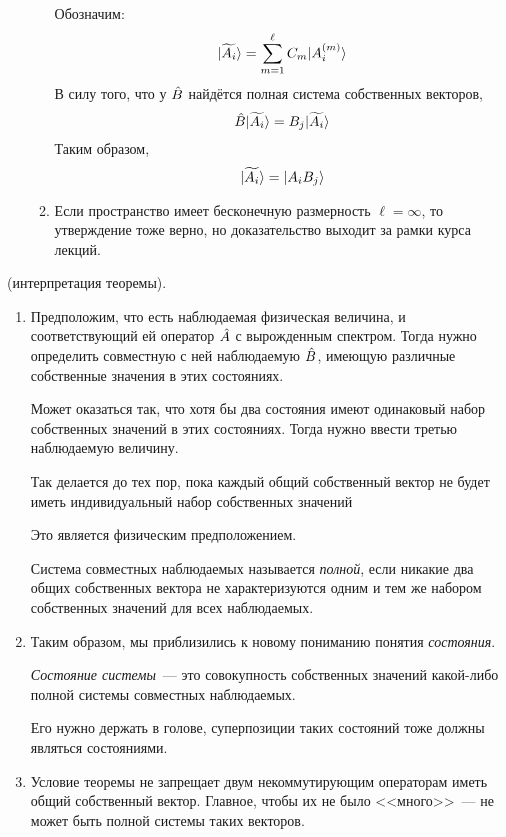\begin{itemize}
\begin{enumerate}
        Обозначим:
        $$
            | \widetilde{A_i} \rangle = \sum_{m=1}^\ell C_m | A_i^{(m)} \rangle
        $$
        В силу того, что у $\Hat B$ найдётся полная система собственных векторов,
        $$
            \Hat B | \widetilde{A_i} \rangle = B_j | \widetilde{A_i} \rangle
        $$
        Таким образом,
        $$
            | \widetilde{A_i} \rangle = | A_i B_j \rangle
        $$
    \item Если пространство имеет бесконечную размерность $\ell = \infty$, то утверждение тоже верно, но доказательство выходит за рамки курса лекций.
  \end{enumerate}%
\end{itemize}%

\Rem (интерпретация теоремы).
\begin{enumerate}
  \item Предположим, что есть наблюдаемая физическая величина, и соответствующий ей оператор $\Hat A$ с вырожденным спектром. Тогда нужно определить совместную с ней наблюдаемую $\Hat B$, имеющую различные собственные значения в этих состояниях.

      Может оказаться так, что хотя бы два состояния имеют одинаковый набор собственных значений в этих состояниях. Тогда нужно ввести третью наблюдаемую величину.

      Так делается до тех пор, пока каждый общий собственный вектор не будет иметь индивидуальный набор собственных значений


      \Ans Это является физическим предположением.

      \Def Система совместных наблюдаемых называется \emph{полной}, если никакие два общих собственных вектора не характеризуются одним и тем же набором собственных значений для всех наблюдаемых.

  \item
        Таким образом, мы приблизились к новому пониманию понятия \emph{состояния}.

        \Def \emph{Состояние системы}~--- это совокупность собственных значений какой-либо полной системы совместных наблюдаемых.


        \Ans Его нужно держать в голове, суперпозиции таких состояний тоже должны являться состояниями.
  \item
        \Rem Условие теоремы не запрещает двум некоммутирующим операторам иметь общий собственный вектор. Главное, чтобы их не было <<много>>~--- не может быть полной системы таких векторов.
\end{enumerate}


